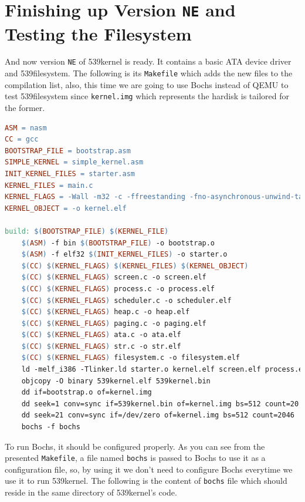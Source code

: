 \section{\texorpdfstring{Finishing up Version \texttt{NE} and Testing
the
Filesystem}{Finishing up Version NE and Testing the Filesystem}}\label{finishing-up-version-ne-and-testing-the-filesystem}

And now version \lstinline!NE! of 539kernel is ready. It contains a
basic ATA device driver and 539filesystem. The following is its
\lstinline!Makefile! which adds the new files to the compilation list,
also, this time we are going to use Bochs instead of QEMU to test
539filesystem since \lstinline!kernel.img! which represents the hardisk
is tailored for the former.

\begin{lstlisting}[language=make]
ASM = nasm
CC = gcc
BOOTSTRAP_FILE = bootstrap.asm 
SIMPLE_KERNEL = simple_kernel.asm
INIT_KERNEL_FILES = starter.asm
KERNEL_FILES = main.c
KERNEL_FLAGS = -Wall -m32 -c -ffreestanding -fno-asynchronous-unwind-tables -fno-pie
KERNEL_OBJECT = -o kernel.elf

build: $(BOOTSTRAP_FILE) $(KERNEL_FILE)
    $(ASM) -f bin $(BOOTSTRAP_FILE) -o bootstrap.o
    $(ASM) -f elf32 $(INIT_KERNEL_FILES) -o starter.o 
    $(CC) $(KERNEL_FLAGS) $(KERNEL_FILES) $(KERNEL_OBJECT)
    $(CC) $(KERNEL_FLAGS) screen.c -o screen.elf
    $(CC) $(KERNEL_FLAGS) process.c -o process.elf
    $(CC) $(KERNEL_FLAGS) scheduler.c -o scheduler.elf
    $(CC) $(KERNEL_FLAGS) heap.c -o heap.elf
    $(CC) $(KERNEL_FLAGS) paging.c -o paging.elf
    $(CC) $(KERNEL_FLAGS) ata.c -o ata.elf
    $(CC) $(KERNEL_FLAGS) str.c -o str.elf
    $(CC) $(KERNEL_FLAGS) filesystem.c -o filesystem.elf
    ld -melf_i386 -Tlinker.ld starter.o kernel.elf screen.elf process.elf scheduler.elf heap.elf paging.elf ata.elf str.elf filesystem.elf -o 539kernel.elf
    objcopy -O binary 539kernel.elf 539kernel.bin
    dd if=bootstrap.o of=kernel.img
    dd seek=1 conv=sync if=539kernel.bin of=kernel.img bs=512 count=20
    dd seek=21 conv=sync if=/dev/zero of=kernel.img bs=512 count=2046
    bochs -f bochs
\end{lstlisting}

To run Bochs, it should be configured properly. As you can see from the
presented \lstinline!Makefile!, a file named \lstinline!bochs! is passed
to Bochs to use it as a configuration file, so, by using it we don't
need to configure Bochs everytime we use it to run 539kernel. The
following is the content of \lstinline!bochs! file which should reside
in the same directory of 539kernel's code.

